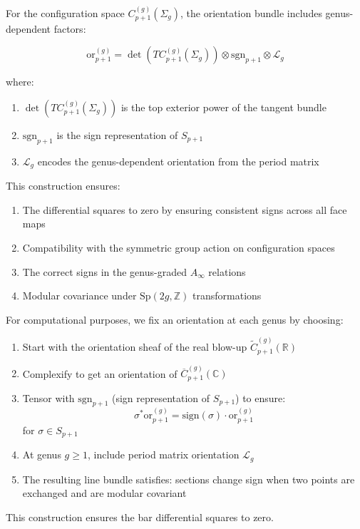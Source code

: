 \begin{definition}
For the configuration space $C_{p+1}^{(g)}(\Sigma_g)$, the orientation bundle includes genus-dependent factors:

$$\text{or}_{p+1}^{(g)} = \det(TC_{p+1}^{(g)}(\Sigma_g)) \otimes \text{sgn}_{p+1} \otimes \mathcal{L}_g$$

where:
\begin{enumerate}
\item $\det(TC_{p+1}^{(g)}(\Sigma_g))$ is the top exterior power of the tangent bundle
\item $\text{sgn}_{p+1}$ is the sign representation of $S_{p+1}$
\item $\mathcal{L}_g$ encodes the genus-dependent orientation from the period matrix
\end{enumerate}

This construction ensures:
\begin{enumerate}
\item The differential squares to zero by ensuring consistent signs across all face maps
\item Compatibility with the symmetric group action on configuration spaces
\item The correct signs in the genus-graded $A_\infty$ relations
\item Modular covariance under $\text{Sp}(2g, \mathbb{Z})$ transformations
\end{enumerate}
\end{definition}

\begin{remark}
For computational purposes, we fix an orientation at each genus by choosing:
\begin{enumerate}
\item Start with the orientation sheaf of the real blow-up $\widetilde{C}_{p+1}^{(g)}(\mathbb{R})$
\item Complexify to get an orientation of $\overline{C}_{p+1}^{(g)}(\mathbb{C})$ 
\item Tensor with $\text{sgn}_{p+1}$ (sign representation of $S_{p+1}$) to ensure:
   $$\sigma^* \text{or}_{p+1}^{(g)} = \text{sign}(\sigma) \cdot \text{or}_{p+1}^{(g)}$$
   for $\sigma \in S_{p+1}$
\item At genus $g \geq 1$, include period matrix orientation $\mathcal{L}_g$
\item The resulting line bundle satisfies: sections change sign when two points are exchanged and are modular covariant
\end{enumerate}
This construction ensures the bar differential squares to zero.
\end{remark}

